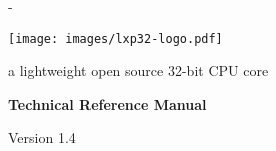 \frontmatter


\thispagestyle{empty}
\calccentering{\unitlength}
\begin{adjustwidth*}{\unitlength}{-\unitlength}
	\vspace*{\fill}
	\begin{center}
	\DoubleSpacing
	\texttt{[image: images/lxp32-logo.pdf]}\par
	\vspace{\onelineskip}
	\huge \lxp{}\par
	\Large a lightweight open source 32-bit CPU core\par
	\LARGE \textbf{Technical Reference Manual}\par
	\vspace{1.2\onelineskip}
	\large Version 1.4\par
	\vspace*{4\onelineskip}
	\end{center}
	\vspace*{\fill}
\end{adjustwidth*}

\clearpage


\thispagestyle{empty}

